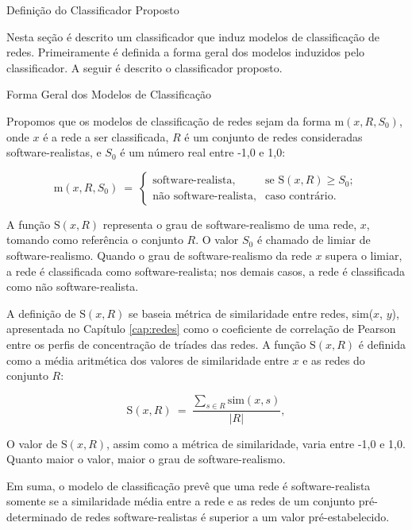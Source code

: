 \begin{section}{Definição do Classificador Proposto} \label{cap:clas2}
	
	Nesta seção é descrito um classificador que induz modelos de classificação de redes. Primeiramente é definida a forma geral dos modelos induzidos pelo classificador. A seguir é descrito o classificador proposto.
	
\begin{subsection}{Forma Geral dos Modelos de Classificação}
	
	Propomos que os modelos de classificação de redes sejam da forma $\mathrm{m}(x, R, S_0)$, onde $x$ é a rede a ser classificada, $R$ é um conjunto de redes consideradas software-realistas, e $S_0$ é um número real entre -1,0 e 1,0:
	
$$
	\mathrm{m}(x, R, S_0) ~=~
	\left\{
	\begin{array}{cl}
	\mbox{software-realista,} & \mbox{se } \mathrm{S}(x, R) \ge S_0; \\
	\mbox{não software-realista,} & \mbox{caso contrário.}
	\end{array}
	\right.
$$
	
	A função $\mathrm{S}(x, R)$ representa o grau de software-realismo de uma rede, $x$, tomando como referência o conjunto $R$. O valor $S_0$ é chamado de limiar de software-realismo. Quando o grau de software-realismo da rede $x$ supera o limiar, a rede é classificada como software-realista; nos demais casos, a rede é classificada como não software-realista.
	
	A definição de $\mathrm{S}(x, R)$ se baseia métrica de similaridade entre redes, sim($x$, $y$), apresentada no Capítulo \ref{cap:redes} como o coeficiente de correlação de Pearson entre os perfis de concentração de tríades das redes. A função $\mathrm{S}(x, R)$ é definida como a média aritmética dos valores de similaridade entre $x$ e as redes do conjunto $R$:

	$$
	\mathrm{S}(x, R) ~=~ \frac{
	\displaystyle\sum_{s \in R} \mathrm{sim}(x, s)
	}{|R|} \mathrm{,}
	$$

	O valor de $\mathrm{S}(x, R)$, assim como a métrica de similaridade, varia entre -1,0 e 1,0. Quanto maior o valor, maior o grau de software-realismo.
	
	Em suma, o modelo de classificação prevê que uma rede é software-realista somente se a similaridade média entre a rede e as redes de um conjunto pré-determinado de redes software-realistas é superior a um valor pré-estabelecido.
	

\end{subsection}
\end{section}

